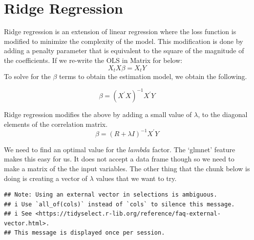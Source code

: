 \documentclass[
]{book}
\newenvironment{Shaded}{\begin{snugshade}}{\end{snugshade}}
\newcommand{\DecValTok}[1]{\textcolor[rgb]{0.00,0.00,0.81}{#1}}
\newcommand{\FunctionTok}[1]{\textcolor[rgb]{0.00,0.00,0.00}{#1}}
\newcommand{\NormalTok}[1]{#1}
\newcommand{\OtherTok}[1]{\textcolor[rgb]{0.56,0.35,0.01}{#1}}
\newcommand{\SpecialCharTok}[1]{\textcolor[rgb]{0.00,0.00,0.00}{#1}}
\begin{document}
\hypertarget{ridge-regression}{%
\section{Ridge Regression}\label{ridge-regression}}

Ridge regression is an extension of linear regression where the loss function is modified to minimize the complexity of the model. This modification is done by adding a penalty parameter that is equivalent to the square of the magnitude of the coefficients. If we re-write the OLS in Matrix for below:
\[X_tX\beta = X_tY\]
To solve for the \(\beta\) terms to obtain the estimation model, we obtain the following.

\[\beta = (X^{'}X)^{-1}X^{'}Y\]

Ridge regression modifies the above by adding a small value of \(\lambda\), to the diagonal elements of the correlation matrix.
\[\beta = (R+\lambda I)^{-1}X^{'}Y\]

We need to find an optimal value for the \(lambda\) factor. The `glmnet' feature makes this easy for us. It does not accept a data frame though so we need to make a matrix of the the input variables. The other thing that the chunk below is doing is creating a vector of \(\lambda\) values that we want to try.

\begin{Shaded}
\end{Shaded}

\begin{verbatim}
## Note: Using an external vector in selections is ambiguous.
## i Use `all_of(cols)` instead of `cols` to silence this message.
## i See <https://tidyselect.r-lib.org/reference/faq-external-vector.html>.
## This message is displayed once per session.
\end{verbatim}
\end{document}
